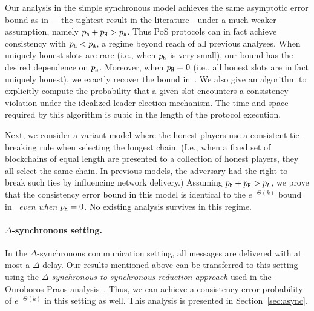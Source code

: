Our analysis in the simple synchronous model achieves the same
asymptotic error bound as in~\cite{LinearConsistencySODA}---the
tightest result in the literature---under a much weaker assumption,
namely $p_{\mathtt{h}} + p_{\mathtt{H}} > p_{\mathtt{A}}$.  Thus PoS protocols can in fact achieve
consistency with $p_{\mathtt{h}} < p_{\mathtt{A}}$, a regime beyond reach of all previous analyses. 
When uniquely honest slots are rare 
(i.e., when $p_{\mathtt{h}}$ is very small), 
our bound has the desired dependence on $p_{\mathtt{h}}$. 
Moreover, when $p_{\mathtt{H}} = 0$ (i.e., all honest slots are in fact
uniquely honest), we exactly recover the bound
in~\cite{LinearConsistencySODA}. 
We also give an algorithm to explicitly compute the probability 
that a given slot encounters a consistency violation 
under the idealized leader election mechanism. 
The time and space required by this algorithm is cubic 
in the length of the protocol execution.

Next, we consider a variant model where the honest players use a
consistent tie-breaking rule when selecting the longest chain.  (I.e.,
when a fixed set of blockchains of equal length are presented to a
collection of honest players, they all select the same chain.
In previous models, the adversary had the right to break such ties by influencing
network delivery.)
Assuming $p_{\mathtt{h}} + p_{\mathtt{H}} > p_{\mathtt{A}}$, we prove that the consistency error
bound in this model is identical to the $e^{-\Theta(k)}$ bound
in~\cite{LinearConsistencySODA} \emph{even when $p_{\mathtt{h}} =
  0$}. No existing analysis survives in this regime.


\paragraph{$\Delta$-synchronous setting.}
In the $\Delta$-synchronous
communication setting, all messages are delivered with at most
a $\Delta$ delay. Our results mentioned above can be transferred to
this setting using the \emph{$\Delta$-synchronous to synchronous reduction
approach} used in the Ouroboros Praos analysis~\cite{Praos}. Thus, we
can achieve a consistency error probability of $e^{-\Theta(k)}$ in this
setting as well. 
This analysis is presented in 
Section~\ref{sec:async}.

